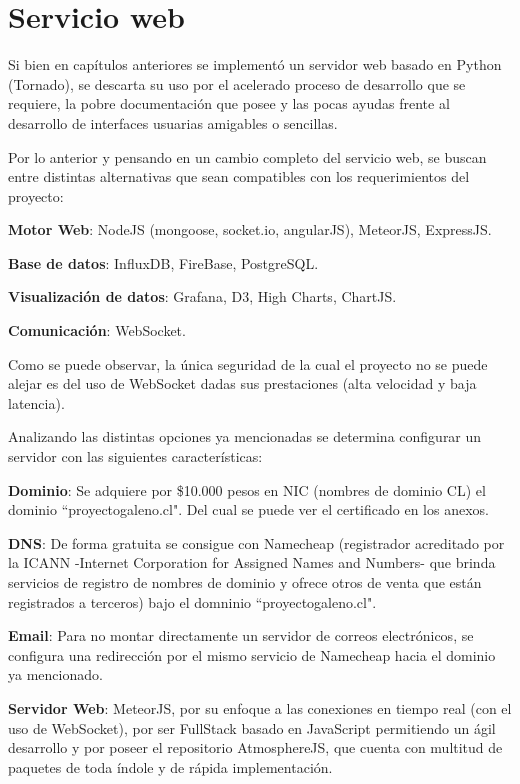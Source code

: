 \section{Servicio web}

Si bien en capítulos anteriores se implementó un servidor web basado en Python (Tornado), se descarta su uso por el acelerado proceso de desarrollo que se requiere, la pobre documentación que posee y las pocas ayudas frente al desarrollo de interfaces usuarias amigables o sencillas.

Por lo anterior y pensando en un cambio completo del servicio web, se buscan entre distintas alternativas que sean compatibles con los requerimientos del proyecto:

\textbf{Motor Web}: NodeJS\cite{nodejs} (mongoose\cite{mongoose}, socket.io\cite{socket}, angularJS\cite{angularjs}), MeteorJS\cite{meteor}, ExpressJS\cite{expressjs}.

\textbf{Base de datos}: InfluxDB\cite{influxdb}, FireBase\cite{firebase}, PostgreSQL\cite{postgresql}.

\textbf{Visualización de datos}: Grafana\cite{grafana}, D3\cite{d3}, High Charts\cite{highcharts}, ChartJS\cite{chartjs}.

\textbf{Comunicación}: WebSocket\cite{websocket}.

Como se puede observar, la única seguridad de la cual el proyecto no se puede alejar es del uso de WebSocket
dadas sus prestaciones (alta velocidad y baja latencia).

\newpage


Analizando las distintas opciones ya mencionadas se determina configurar un servidor con las siguientes características:
 
 \textbf{Dominio}: Se adquiere por \$10.000 pesos en NIC (nombres de dominio CL) el dominio ``proyectogaleno.cl". Del cual se puede ver el certificado en los anexos.
 
\textbf{DNS}: De forma gratuita se consigue con Namecheap\cite{namecheap} (registrador acreditado por la ICANN -Internet Corporation for Assigned Names and Numbers- que brinda servicios de registro de nombres de dominio y ofrece otros de venta que están registrados a terceros) bajo el domninio ``proyectogaleno.cl".

\textbf{Email}: Para no montar directamente un servidor de correos electrónicos, se configura una redirección por el mismo servicio de Namecheap hacia el dominio ya mencionado.

\textbf{Servidor Web}: MeteorJS, por su enfoque a las conexiones en tiempo real (con el uso de WebSocket), por ser FullStack basado en JavaScript permitiendo un ágil desarrollo y por poseer el repositorio AtmosphereJS\cite{atmosphere}, que cuenta con multitud de paquetes de toda índole y de rápida implementación.

